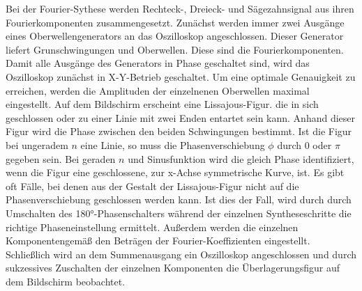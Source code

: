 Bei der Fourier-Sythese werden Rechteck-, Dreieck- und Sägezahnsignal 
aus ihren Fourierkomponenten zusammengesetzt. 
Zunächst werden immer zwei Ausgänge eines Oberwellengenerators an das 
Oszilloskop angeschlossen. Dieser Generator liefert Grunschwingungen 
und Oberwellen. Diese sind die Fourierkomponenten. Damit alle Ausgänge 
des Generators in Phase geschaltet sind, wird das Oszilloskop zunächst 
in X-Y-Betrieb geschaltet.
Um eine optimale Genauigkeit zu erreichen, werden die Amplituden der
einzelnenen Oberwellen maximal eingestellt. 
Auf dem Bildschirm erscheint eine Lissajous-Figur. die in sich geschlossen 
oder zu einer Linie mit zwei Enden entartet sein kann. Anhand dieser 
Figur wird die Phase zwischen den beiden Schwingungen bestimmt. Ist die
Figur bei ungeradem $n$ eine Linie, so muss die Phasenverschiebung $\phi$ 
durch 0 oder $\pi$ gegeben sein. Bei geraden $n$ und Sinusfunktion wird
die gleich Phase identifiziert, wenn die Figur eine geschlossene, zur 
x-Achse symmetrische Kurve, ist. Es gibt oft Fälle, bei denen aus der
Gestalt der Lissajous-Figur nicht auf die Phasenverschiebung geschlossen 
werden kann. Ist dies der Fall, wird durch durch Umschalten des 180°-Phasenschalters
während der einzelnen Syntheseschritte die richtige Phaseneinstellung ermittelt. 
Außerdem werden die einzelnen Komponentengemäß den Beträgen der Fourier-Koeffizienten
eingestellt. Schließlich wird an dem Summenausgang ein Oszilloskop 
angeschlossen und durch sukzessives Zuschalten der einzelnen Komponenten 
die Überlagerungsfigur auf dem Bildschirm beobachtet. 